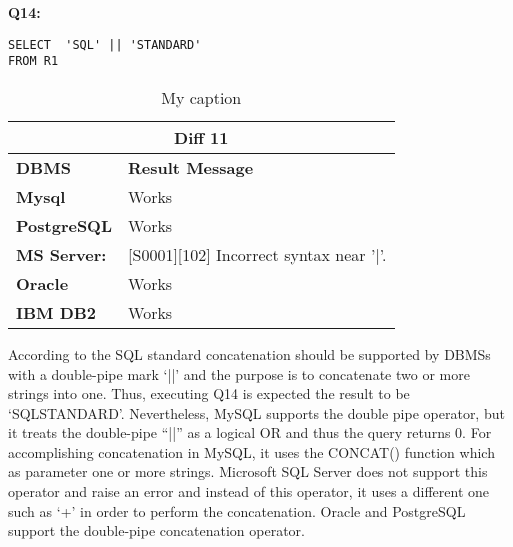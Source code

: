 \begin{mdframed}[backgroundcolor=lightgray!20] 
\textbf{Q14:}
\begin{lstlisting}
SELECT  'SQL' || 'STANDARD'
FROM R1
\end{lstlisting}
\end{mdframed} 
 
\begin{table}[]
\centering
\caption{My caption}
\label{my-label}
\begin{tabular}{|l|l|}
\hline
\multicolumn{2}{|c|}{\textbf{Diff 11}}                                                                              \\ \hline
\textbf{DBMS}                              & \textbf{Result Message}                                                \\ \hline
{\color[HTML]{333333} \textbf{Mysql}}      & {\color[HTML]{333333} Works}                                           \\ \hline
{\color[HTML]{333333} \textbf{PostgreSQL}} & {\color[HTML]{333333} Works}                                           \\ \hline
{\color[HTML]{333333} \textbf{MS Server:}} & {\color[HTML]{333333} {[}S0001{]}{[}102{]} Incorrect syntax near '|'.} \\ \hline
\textbf{Oracle}                            & Works                                                                  \\ \hline
\textbf{IBM DB2}                           & Works                                                                  \\ \hline
\end{tabular}
\end{table}

According to the SQL standard concatenation should be supported by DBMSs with a double-pipe mark ‘||’ and the purpose is to concatenate two or more strings into one. Thus, executing Q14 is expected the result to be ‘SQLSTANDARD’. Nevertheless, MySQL supports the double pipe operator, but it treats the double-pipe “||” as a logical OR and thus the query returns 0. For accomplishing concatenation in MySQL, it uses the CONCAT() function which as parameter one or more strings.   Microsoft SQL Server does not support this operator and raise an error and instead of this operator, it uses a different one such as ‘+’  in order to perform the concatenation. Oracle and PostgreSQL support the double-pipe  concatenation operator. 



